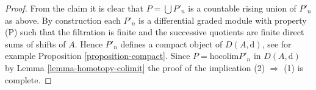 \begin{proof}
\medskip\noindent
From the claim it is clear that $P = \bigcup P'_n$
is a countable rising union of $P'_n$ as above.
By construction each $P'_n$ is a differential graded module with
property (P) such that the filtration is finite and the successive
quotients are finite direct sums of shifts of $A$. Hence $P'_n$
defines a compact object of $D(A, \text{d})$, see for example
Proposition \ref{proposition-compact}. Since
$P = \text{hocolim} P'_n$ in $D(A, \text{d})$
by Lemma \ref{lemma-homotopy-colimit}
the proof of the implication (2) $\Rightarrow$ (1) is complete.
\end{proof}
